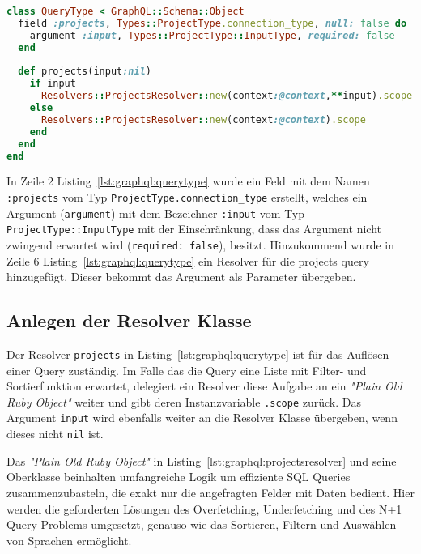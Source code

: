\begin{lstlisting}[language=Ruby,float=h!,caption={Definition des QueryType als Einstiegspunkt in alle Queries. \lstinline|/graphql/types/query_type.rb|}, label={lst:graphql:querytype}]
class QueryType < GraphQL::Schema::Object
  field :projects, Types::ProjectType.connection_type, null: false do
    argument :input, Types::ProjectType::InputType, required: false
  end
  
  def projects(input:nil)
    if input
      Resolvers::ProjectsResolver::new(context:@context,**input).scope
    else
      Resolvers::ProjectsResolver::new(context:@context).scope
    end
  end
end
\end{lstlisting}

In Zeile 2 Listing~\ref{lst:graphql:querytype} wurde ein Feld mit dem Namen \lstinline|:projects| vom Typ \lstinline|ProjectType.connection_type| erstellt, welches ein Argument (\lstinline|argument|) mit dem Bezeichner \lstinline|:input| vom Typ \lstinline|ProjectType::InputType| mit der Einschränkung, dass das Argument nicht zwingend erwartet wird (\lstinline|required: false|), besitzt.
Hinzukommend wurde in Zeile 6 Listing~\ref{lst:graphql:querytype} ein Resolver für die projects query hinzugefügt. Dieser bekommt das Argument als Parameter übergeben.

\subsection{Anlegen der Resolver Klasse}
\label{impl:graphql:resolver}
\label{graphql:resolver}
Der Resolver \lstinline|projects| in Listing~\ref{lst:graphql:querytype} ist für das Auflösen einer Query zuständig. Im Falle das die Query eine Liste mit Filter- und Sortierfunktion erwartet,
delegiert ein Resolver diese Aufgabe an ein \emph{"Plain Old Ruby Object"} weiter und gibt deren Instanzvariable \lstinline|.scope| zurück. Das Argument \lstinline|input| wird ebenfalls weiter an die Resolver Klasse übergeben, wenn dieses nicht \lstinline|nil| ist. 

Das \emph{"Plain Old Ruby Object"} in Listing~\ref{lst:graphql:projectsresolver} und seine Oberklasse beinhalten umfangreiche Logik um effiziente SQL Queries zusammenzubasteln, die exakt nur die angefragten Felder mit Daten bedient. Hier werden die geforderten Lösungen des Overfetching, Underfetching und des N+1 Query Problems umgesetzt, genauso wie das Sortieren, Filtern und Auswählen von Sprachen ermöglicht.


